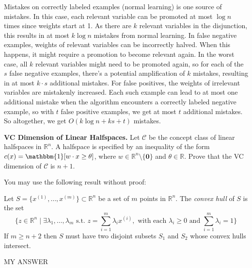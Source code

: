 \documentclass[11pt]{article}
\newcommand*{\C}{{\mathcal C}}
\newcommand*{\R}{\mathbb{R}}
\DeclareMathOperator{\1}{\mathbbm{1}}
\begin{document}
Mistakes on correctly labeled examples (normal learning) is one source of mistakes. In this case, each relevant variable can be promoted at most $\log n$ times since weights start at 1. As there are $k$ relevant variables in the disjunction, this results in at most $k \log n$ mistakes from normal learning. In false negative examples, weights of relevant variables can be incorrectly halved. When this happens, it might require a promotion to become relevant again. In the worst case, all $k$ relevant variables might need to be promoted again, so for each of the $s$ false negative examples, there's a potential amplification of $k$ mistakes, resulting in at most $k \cdot s$ additional mistakes. For false positives, the weights of irrelevant variables are mistakenly increased. Each such example can lead to at most one additional mistake when the algorithm encounters a correctly labeled negative example, so with $t$ false positive examples, we get at most $t$ additional mistakes. So altogether, we get $O(k \log n + ks + t)$ mistakes.


\begin{problem} [15pts] \textbf{VC Dimension of Linear Halfspaces.}
	Let $\C$ be the concept class of linear halfspaces in $\R^n$. A halfspace is specified by an inequality of the form $c(x) = \1[w \cdot x \geq \theta]$, where $w \in \R^n\setminus\{\mathbf{0}\}$ and $\theta \in \R$. Prove that the VC dimension of $\C$ is $n+1$.
\end{problem}
\begin{note}
	You may use the following result without proof:
	\begin{theorem}
		Let $S =
		\{x^{(1)},\dots,x^{(m)}\} \subset \R^n$ be a set of $m$
		points in $\R^n.$  The {\em convex hull} of $S$ is the set
		\[
		\{ z \in \R^n \mid \exists \lambda_1,\ldots,\lambda_m \text{\ s.t.\ } z = \sum_{i=1}^m \lambda_i x^{(i)}, \text{\ with each\ }\lambda_i \geq 0 \text{\ and\ } \sum_{i=1}^m \lambda_i = 1\}
		\] 
		If $m \geq n+2$ then $S$ must have two disjoint subsets
		$S_1$ and $S_2$ whose convex hulls intersect.
	\end{theorem}
\end{note}

MY ANSWER
\end{document}
